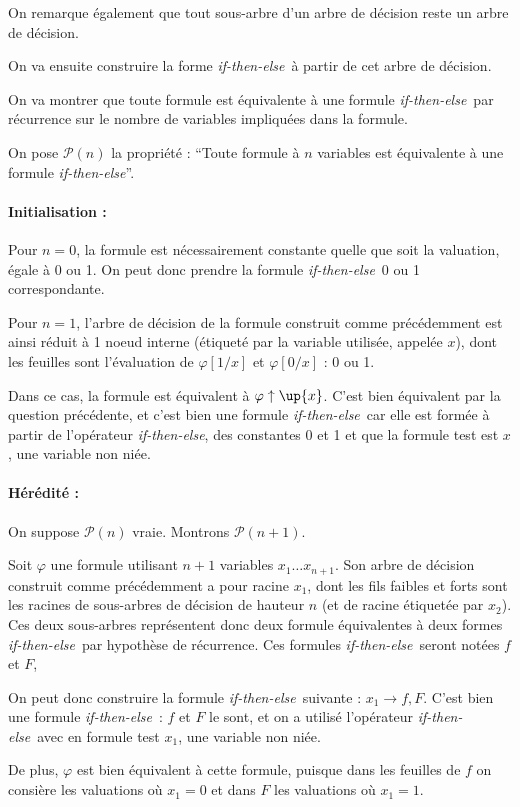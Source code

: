 \documentclass[12pt]{article}
\def\phix{\varphi\uparrow\up{x}}
\def\ite{\textit{if-then-else}}
\def\P{\mathcal{P}}
\begin{document}
On remarque également que tout sous-arbre d'un arbre de décision reste un arbre de décision. %

On va ensuite construire la forme \ite\ à partir de cet arbre de décision.

On va montrer que toute formule est équivalente à une formule \ite\ par récurrence sur le nombre de variables impliquées dans la formule.

On pose $\P(n)$ la propriété : ``Toute formule à $n$ variables est équivalente à une formule \ite''.

\paragraph{Initialisation : } 
Pour $n=0$, la formule est nécessairement constante quelle que soit la valuation, égale à 0 ou 1. On peut donc prendre la formule \ite\ 0 ou 1 correspondante.

Pour $n=1$, l'arbre de décision de la formule construit comme précédemment est ainsi réduit à 1 noeud interne (étiqueté par la variable utilisée, appelée $x$), dont les feuilles sont l'évaluation de $\varphi [ 1/x ]$ et $\varphi [ 0/x ]$ : 0 ou 1.

Dans ce cas, la formule est équivalent à $\phix$. C'est bien équivalent par la question précédente, et c'est bien une formule \ite\ car elle est formée à partir de l'opérateur \ite, des constantes 0 et 1 et que la formule test est $x$, une variable non niée.

\paragraph{Hérédité : }
On suppose $\P (n)$ vraie. Montrons $\P (n+1)$.

Soit $\varphi$ une formule utilisant $n+1$ variables $x_1\dots x_{n+1}$. Son arbre de décision construit comme précédemment a pour racine $x_1$, dont les fils faibles et forts sont les racines de sous-arbres de décision de hauteur $n$ (et de racine étiquetée par $x_2$). Ces deux sous-arbres représentent donc deux formule équivalentes à deux formes \ite\ par hypothèse de récurrence. Ces formules \ite\ seront notées $f$ et $F$,

On peut donc construire la formule \ite\ suivante : $x_1\rightarrow f,F$. C'est bien une formule \ite\ : $f$ et $F$ le sont, et on a utilisé l'opérateur \ite\ avec en formule test $x_1$, une variable non niée.

De plus, $\varphi$ est bien équivalent à cette formule, puisque dans les feuilles de $f$ on consière les valuations où $x_1 = 0$ et dans $F$ les valuations où $x_1 = 1$.
\end{document}
